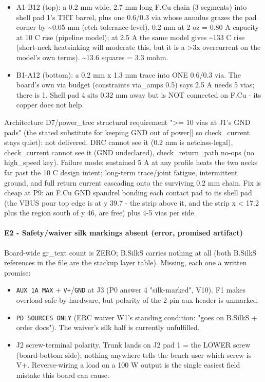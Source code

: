 \documentclass[11pt,a4paper]{article}
\begin{document}
\begin{itemize}
\item A1-B12 (top): a 0.2 mm wide, 2.7 mm long F.Cu chain (3 segments) into shell pad 1's
THT barrel, plus one 0.6/0.3 via whose annulus grazes the pad corner by \textasciitilde{}0.05 mm
(etch-tolerance-level). 0.2 mm at 2 oz = 0.80 A capacity at 10 C rise (pipeline
model); at 2.5 A the same model gives \textasciitilde{}133 C rise (short-neck heatsinking will
moderate this, but it is a \textgreater{}3x overcurrent on the model's own terms). \textasciitilde{}13.6 squares
= 3.3 mohm.
\item B1-A12 (bottom): a 0.2 mm x 1.3 mm trace into ONE 0.6/0.3 via. The board's own via
budget (constraints via\_amps 0.5) says 2.5 A needs 5 vias; there is 1. Shell pad 4
sits 0.32 mm away but is NOT connected on F.Cu - its copper does not help.
\end{itemize}
Architecture D7/power\_tree structural requirement "\textgreater{}= 10 vias at J1's GND pads" (the stated substitute for keeping GND out of power{[}{]} so check\_current stays quiet): not delivered. DRC cannot see it (0.2 mm is netclass-legal), check\_current cannot see it (GND undeclared), check\_return\_path no-ops (no high\_speed key). Failure mode: sustained 5 A at any profile heats the two necks far past the 10 C design intent; long-term trace/joint fatigue, intermittent ground, and full return current cascading onto the surviving 0.2 mm chain. Fix is cheap at P9: an F.Cu GND spandrel bonding each contact pad to its shell pad (the VBUS pour top edge is at y 39.7 - the strip above it, and the strip x \textless{} 17.2 plus the region south of y 46, are free) plus 4-5 vias per side.

\paragraph*{E2 - Safety/waiver silk markings absent (error, promised artifact)}
Board-wide gr\_text count is ZERO; B.SilkS carries nothing at all (both B.SilkS references in the file are the stackup layer table). Missing, each one a written promise:

\begin{itemize}
\item \texttt{AUX 1A MAX} + \texttt{V+}/\texttt{GND} at J3 (P0 answer 4 "silk-marked", V10). F1 makes overload
safe-by-hardware, but polarity of the 2-pin aux header is unmarked.
\item \texttt{PD SOURCES ONLY} (ERC waiver W1's standing condition: "goes on B.SilkS + order
docs"). The waiver's silk half is currently unfulfilled.
\item J2 screw-terminal polarity. Trunk lands on J2 pad 1 = the LOWER screw (board-bottom
side); nothing anywhere tells the bench user which screw is V+. Reverse-wiring a
load on a 100 W output is the single easiest field mistake this board can cause.
\end{itemize}
\end{document}
